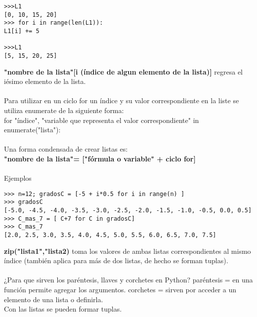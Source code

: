\documentclass[letter paper, 12pt, oneside]{article}
\begin{document}
\begin{verbatim}
>>>L1
[0, 10, 15, 20]
>>> for i in range(len(L1)):
L1[i] += 5

>>>L1
[5, 15, 20, 25]
\end{verbatim}
\textbf{"nombre de la lista"[i (índice de algun elemento de la lista)]} regresa el iésimo elemento de la lista. 
\\\\
Para utilizar en un ciclo for un índice y su valor correspondiente en la liste se utiliza enumerate de la siguiente forma:
\\
for "índice", "variable que representa el valor correspondiente" in enumerate("lista"):
\\\\
Una forma condensada de crear listas es:
\\
\textbf{"nombre de la lista"= ["fórmula o variable" + ciclo for]}
\\\\
Ejemplos
\begin{verbatim}
>>> n=12; gradosC = [-5 + i*0.5 for i in range(n) ]
>>> gradosC
[-5.0, -4.5, -4.0, -3.5, -3.0, -2.5, -2.0, -1.5, -1.0, -0.5, 0.0, 0.5]
>>> C_mas_7 = [ C+7 for C in gradosC]
>>> C_mas_7
[2.0, 2.5, 3.0, 3.5, 4.0, 4.5, 5.0, 5.5, 6.0, 6.5, 7.0, 7.5]
\end{verbatim}
\textbf{zip("lista1","lista2)} toma los valores de ambas listas correspondientes al mismo índice (también aplica para más de dos listas, de hecho se forman tuplas).
\\\\
¿Para que sirven los paréntesis, llaves y corchetes en Python?
paréntesis = en una función permite agregar los argumentos.
corchetes = sirven por acceder a un elemento de una lista o definirla.
\\
Con las listas se pueden formar tuplas. 
\end{document}
